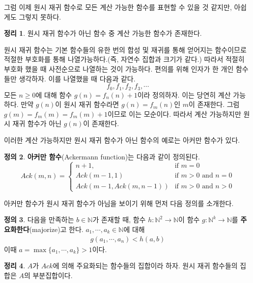 \documentclass[b5paper, 10pt]{book}
\theoremstyle{definition}
\newtheorem{defn}{정의}[chapter]
\newtheorem{thm}[defn]{정리}
\newenvironment{pf*}{\pushQED{\qed}\pf}{\popQED\endpf}
\begin{document}
그럼 이제 원시 재귀 함수로 모든 계산 가능한 함수를 표현할 수 있을 것 같지만, 아쉽게도 그렇지 못하다.
\begin{thm}
    원시 재귀 함수가 아닌 함수 중 계산 가능한 함수가 존재한다.
\end{thm} 
\begin{pf*}
원시 재귀 함수는 기본 함수들의 유한 번의 합성 및 재귀를 통해 얻어지는 함수이므로 적절한 부호화를 통해 
나열가능하다.(즉, 자연수 집합과
크기가 같다.) 따라서 적절히 부호화 했을 때 사전순으로 나열하는 것이 가능하다. 편의를 위해 인자가 한 개인
함수들만 생각하자. 이를 나열했을 때 다음과 같다.
$$f_0, f_1, f_2, f_3, \cdots $$
모든 $n \ge 0$에 대해 함수 $g(n) = f_n (n) +  1$이라 정의하자. 이는 당연히 계산 가능하다.
만약 $g(n)$이 원시 재귀 함수라면 $g(n) = f_m(n)$인 $m$이 존재한다.  
그럼 $g(m) = f_m(m) = f_m(m) + 1$이므로 이는 모순이다. 따라서 계산 가능하지만 원시 재귀 함수가 아닌
$g(n)$이 존재한다. 
\end{pf*}
이러한 계산 가능하지만 원시 재귀 함수가 아닌 함수의 예로는 아커만 함수가 있다.
\begin{defn}
    \textbf{아커만 함수}(Ackermann function)는 다음과 같이 정의된다. 
    $$Ack(m,n) = \begin{cases}
        n+1, & \text{if } m = 0 \\ 
        Ack(m-1, 1) & \text{if } m > 0 \text{ and } n = 0 \\ 
        Ack(m-1, Ack(m, n-1)) & \text{if } m>0 \text{ and } n > 0 
    \end{cases} $$
\end{defn}
아커만 함수가 원시 재귀 함수가 아님을 보이기 위해 먼저 다음 정의를 소개한다.
\begin{defn}
    다음을 만족하는 $b\in \mathbb{N}$가 존재할 때, 함수 $h:\mathbb{N}^2 \rightarrow \mathbb{N}$이 
    함수 $g:\mathbb{N}^k\rightarrow \mathbb{N}$를
    \textbf{주요화한다}(majorize)고 한다. $a_1, \cdots, a_k \in \mathbb{N}$에 대해
    \begin{align*}
        g(a_1, \cdots, a_n) < h(a, b)
    \end{align*}
    이때 $a = \max{\{a_1, \cdots, a_k\}} > 1$이다. 
\end{defn} 
\begin{thm} \label{forack}
    $A$가 $Ack$에 의해 주요화되는 함수들의 집합이라 하자. 원시 재귀 함수들의 집합은 $A$의 부분집합이다.
\end{thm}
\end{document}
